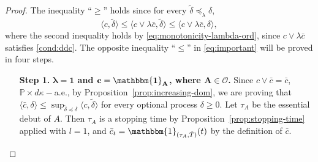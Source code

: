 \documentclass[11pt, oneside]{article}   	%
\theoremstyle{plain}
\theoremstyle{definition}
\theoremstyle{remark}
\begin{document}
\begin{proof}
The inequality ``$\geq$'' holds since for every $\tilde{\delta}\preceq_\lambda\delta$,
$$\langle c,\tilde\delta \rangle \leq \langle c\vee\lambda\bar{c},\tilde\delta\rangle\leq\langle c\vee\lambda\bar{c},\delta \rangle,$$
where the second inequality holds by \eqref{eq:monotonicity-lambda-ord}, since $c\vee\lambda\bar{c}$ satisfies \eqref{cond:ddc}. The opposite inequality ``$\leq$'' in \eqref{eq:important} will be proved in four steps.
\begin{enumerate}
\item[\textbf{Step 1.}] \textbf{$\mathbf{\lambda=1}$ and $\mathbf{c=\mathbbm{1}_A}$, where $\mathbf{A\in\mathcal{O}}$.} Since $c\vee\bar{c}=\bar{c}$, $\mathbb{P}\times d\kappa-$a.e., by Proposition~\ref{prop:increasing-dom}, we are proving that
$\langle\bar{c},\delta \rangle\leq\sup_{\tilde{\delta}\preceq\delta}\langle c,\tilde{\delta}\rangle$ for every optional process $\delta\geq 0$.
Let $\tau_A$ be the essential debut of $A$. Then $\tau_A$ is a stopping time by Proposition~\ref{prop:stopping-time} applied with $l=1$, and $\bar{c}_t=\mathbbm{1}_{(\tau_A,\hat{T})}(t)$ by the definition of $\bar{c}$.


\end{enumerate}
\end{proof}
\end{document}
